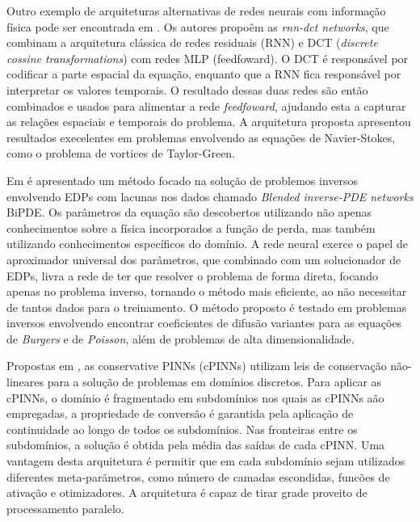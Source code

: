 Outro exemplo de arquiteturas alternativas de redes neurais com informação física
pode ser encontrada em \cite{benjamin-etal:2022-rnn-dct-networks}. 
Os autores propoêm as \textit{rnn-dct networks}, que combinam a arquitetura clássica
de redes residuais (RNN) e DCT (\textit{discrete cossine transformations}) com 
redes MLP (feedfoward). O DCT é responsável por codificar a parte espacial da equação,
enquanto que a RNN fica responsável por interpretar os valores temporais.
O resultado dessas duas redes são então combinados e usados para alimentar a rede
\textit{feedfoward}, ajudando esta a capturar as relações espaciais e temporais do
problema. A arquitetura proposta apresentou resultados execelentes em problemas 
envolvendo as equações de Navier-Stokes, como o problema de vortices de Taylor-Green.

Em \cite{pakravan-et:2021-bipde} é apresentado um método focado na solução de 
problemos inversos envolvendo EDPs com lacunas nos dados chamado 
\textit{Blended inverse-PDE networks} BiPDE.
Os parâmetros da equação são descobertos utilizando não apenas conhecimentos sobre
a física incorporados a função de perda, mas também utilizando conhecimentos específicos 
do domínio. 
A rede neural exerce o papel de aproximador universal dos parâmetros, que combinado 
com um solucionador de EDPs, livra a rede de ter que resolver o problema de 
forma direta, focando apenas no problema inverso, tornando o método mais eficiente,
ao não necessitar de tantos dados para o treinamento.
O método proposto é testado em problemas inversos envolvendo encontrar coeficientes
de difusão variantes para as equações de \textit{Burgers} e de \textit{Poisson}, 
além de problemas de alta dimensionalidade.

Propostas em \cite{jagtap-etal:2020-convervative-pinns}, as conservative PINNs 
(cPINNs) utilizam leis de conservação não-lineares para a solução de problemas 
em domínios discretos. Para aplicar as cPINNs, o domínio é fragmentado em subdomínios
nos quais as cPINNs aão empregadas, a propriedade de conversão é garantida pela 
aplicação de continuidade ao longo de todos os subdomínios. Nas fronteiras entre
os subdomínios, a solução é obtida pela média das saídas de cada cPINN.
Uma vantagem desta arquitetura é permitir que em cada subdomínio sejam utilizados
diferentes meta-parãmetros, como número de camadas escondidas, funcões de ativação
e otimizadores.
A arquitetura é capaz de tirar grade proveito de processamento paralelo.  

